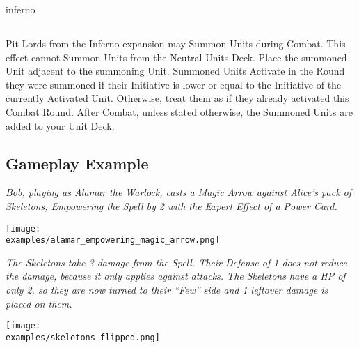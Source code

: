 \begin{multicols*}{2}

\begin{expansion}[before=\vspace*{-11mm}]{inferno}
  \subsection*{}
  Pit Lords from the Inferno expansion may Summon Units during Combat.
  This effect cannot Summon Units from the Neutral Units Deck.
  Place the summoned Unit adjacent to the summoning Unit.
  Summoned Units Activate in the Round they were summoned if their Initiative is lower or equal to the Initiative of the currently Activated Unit.
  Otherwise, treat them as if they already activated this Combat Round.
  After Combat, unless stated otherwise, the Summoned Units are added to your Unit Deck.
\end{expansion}
\vspace*{\fill}

\subsection*{Gameplay Example}

\textit{Bob, playing as Alamar the Warlock, casts a Magic Arrow against Alice's pack of Skeletons, Empowering  the Spell by 2 with the Expert  Effect  of a Power Card.}

\medskip

\texttt{[image: \\examples/alamar\_empowering\_magic\_arrow.png]}

\medskip

\textit{The Skeletons take 3 damage  from the Spell.
  Their Defense  of 1 does not reduce the damage, because it only applies against attacks.
  The Skeletons have a HP  of only 2, so they are now turned to their ``Few'' side and 1 leftover damage  is placed on them.
}

\bigskip

\texttt{[image: \\examples/skeletons\_flipped.png]}

\end{multicols*}
